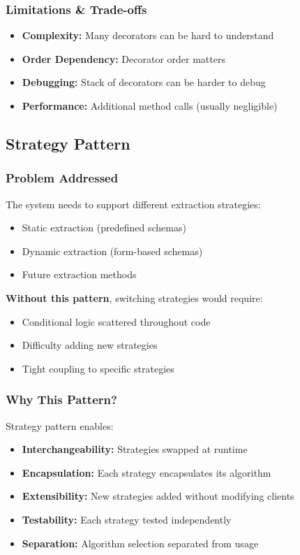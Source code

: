 \documentclass[11pt, a4paper]{article}
\theoremstyle{plain}
\theoremstyle{definition}
\begin{document}
\subsubsection{Limitations \& Trade-offs}

\begin{itemize}
    \item \textbf{Complexity:} Many decorators can be hard to understand
    \item \textbf{Order Dependency:} Decorator order matters
    \item \textbf{Debugging:} Stack of decorators can be harder to debug
    \item \textbf{Performance:} Additional method calls (usually negligible)
\end{itemize}

\subsection{Strategy Pattern}

\subsubsection{Problem Addressed}

The system needs to support different extraction strategies:
\begin{itemize}
    \item Static extraction (predefined schemas)
    \item Dynamic extraction (form-based schemas)
    \item Future extraction methods
\end{itemize}

\textbf{Without this pattern}, switching strategies would require:
\begin{itemize}
    \item Conditional logic scattered throughout code
    \item Difficulty adding new strategies
    \item Tight coupling to specific strategies
\end{itemize}

\subsubsection{Why This Pattern?}

Strategy pattern enables:
\begin{itemize}
    \item \textbf{Interchangeability:} Strategies swapped at runtime
    \item \textbf{Encapsulation:} Each strategy encapsulates its algorithm
    \item \textbf{Extensibility:} New strategies added without modifying clients
    \item \textbf{Testability:} Each strategy tested independently
    \item \textbf{Separation:} Algorithm selection separated from usage
\end{itemize}
\end{document}
